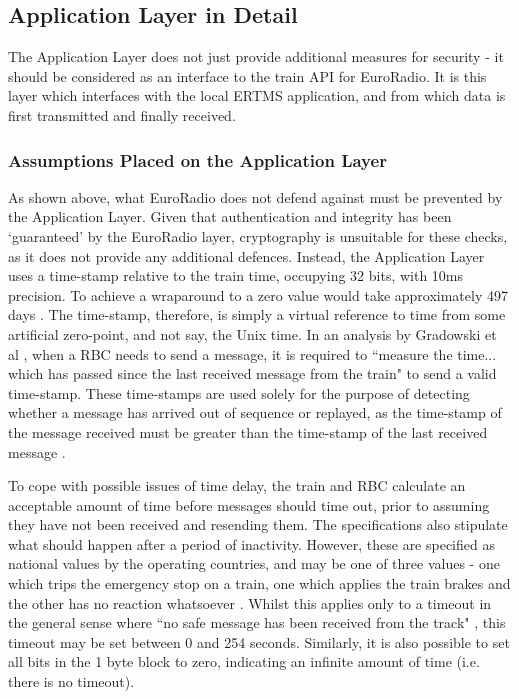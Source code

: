 \documentclass[twoside,11pt,a4paper]{article}
\begin{document}
\subsection{Application Layer in Detail}
The Application Layer does not just provide additional measures for security - it should be considered as an interface to the train API for EuroRadio. It is this layer which interfaces with the local ERTMS application, and from which data is first transmitted and finally received.

\subsubsection{Assumptions Placed on the Application Layer}
As shown above, what EuroRadio does not defend against must be prevented by the Application Layer. Given that authentication and integrity has been `guaranteed' by the EuroRadio layer, cryptography is unsuitable for these checks, as it does not provide any additional defences. Instead, the Application Layer uses a time-stamp relative to the train time, occupying 32 bits, with 10ms precision. To achieve a wraparound to a zero value would take approximately 497 days \citep[Section 7.5.1.154]{SUBSET-026-7}. The time-stamp, therefore, is simply a virtual reference to time from some artificial zero-point, and not say, the Unix time. In an analysis by Gradowski et al \citep{Gradowski14a}, when a RBC needs to send a message, it is required to ``measure the time... which has passed since the last received message from the train" to send a valid time-stamp. These time-stamps are used solely for the purpose of detecting whether a message has arrived out of sequence or replayed, as the time-stamp of the message received must be greater than the time-stamp of the last received message \citep{Ansaldo05a}.

To cope with possible issues of time delay, the train and RBC calculate an acceptable amount of time before messages should time out, prior to assuming they have not been received and resending them. The specifications also stipulate what should happen after a period of inactivity. However, these are specified as national values by the operating countries, and may be one of three values - one which trips the emergency stop on a train, one which applies the train brakes and the other has no reaction whatsoever \citep{RSSB12a}. Whilst this applies only to a timeout in the general sense where ``no safe message has been received from the track" \citep[p. 81]{SUBSET-026-7}, this timeout may be set between 0 and 254 seconds. Similarly, it is also possible to set all bits in the 1 byte block to zero, indicating an infinite amount of time (i.e. there is no timeout).
\end{document}
